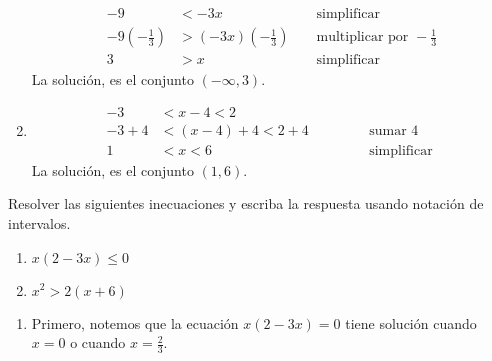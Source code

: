 \documentclass[11pt,a4]{aleph-examen}
\begin{document}
\begin{preguntas}
\begin{respuesta}
\begin{enumerate}[label=\textit{\alph*)}]
$$\begin{aligned}
            -9  &< -3x 
            && \text{ simplificar } \\
            -9 \left(-\frac{1}{3}\right) &> (-3x)\left(-\frac{1}{3}\right) 
            && \text{ multiplicar por } -\frac{1}{3} \\
            3 &> x 
            && \text{ simplificar } 
        \end{aligned}
        $$
        La solución, es el conjunto $(-\infty,3)$.
        \item 
        $$
        \begin{aligned}
            -3 &< x-4 < 2 & \\
            -3 + 4 &< (x-4) + 4 < 2+4 
            &\hspace{1cm}& \text{ sumar }4 \\
            1  &< x < 6 
            && \text{ simplificar }
        \end{aligned}
        $$
        La solución, es el conjunto $(1,6)$.\qedhere
    \end{enumerate}
\end{respuesta}
\item Resolver las siguientes inecuaciones y escriba la respuesta usando notación de intervalos.
\begin{multicols}{2}
    \begin{enumerate}[label=\textit{\alph*)}]
        \item $x(2-3x) \leq 0$
        \item $x^2 > 2(x+6)$
    \end{enumerate}
\end{multicols}
\begin{respuesta}
    \begin{enumerate}[label=\textit{\alph*)}]
        \item Primero, notemos que la ecuación $x(2-3x) = 0$ tiene solución cuando $x = 0$ o cuando $x = \frac{2}{3}$.
        

\end{enumerate}
\end{respuesta}
\end{preguntas}
\end{document}
